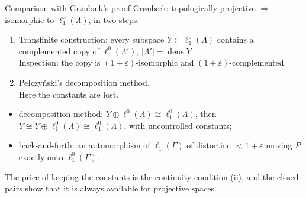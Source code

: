 \documentclass[10pt,aspectratio=169]{beamer}
\newcommand{\lo}[1]{\ell_1^0(#1)}
\newcommand{\ellone}[1]{\ell_1(#1)}
\newcommand{\dens}{\operatorname{dens}}
\begin{document}
\begin{frame}{Comparison with Gr{\o}nb{\ae}k's proof}
  Gr{\o}nb{\ae}k: topologically projective $\Rightarrow$ isomorphic to $\lo\Lambda$, in two steps.
  \begin{enumerate}
    \item Transfinite construction: every subspace $Y\subset\lo\Lambda$ contains a
      complemented copy of $\lo{\Lambda'}$, $|\Lambda'|=\dens Y$. \\
      \textcolor{good}{Inspection: the copy is $(1+\varepsilon)$-isomorphic and
      $(1+\varepsilon)$-complemented.}
    \item Pe{\l}czy\'nski's decomposition method. \\
      \textcolor{accent}{Here the constants are lost.}
  \end{enumerate}
  \medskip
  \begin{itemize}
    \item decomposition method: $Y\oplus\lo\Lambda\cong\lo\Lambda$, then
      $Y\cong Y\oplus\lo\Lambda\cong\lo\Lambda$, with uncontrolled constants;
    \item back-and-forth: an automorphism of $\ellone\Gamma$ of distortion
      $<1+\varepsilon$ moving $P$ exactly onto $\lo\Gamma$.
  \end{itemize}

  The price of keeping the constants is the continuity condition (ii), and the
  closed pairs show that it is always available for projective spaces.
\end{frame}
\end{document}
